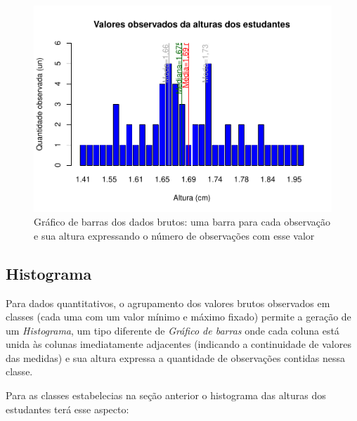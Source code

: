 \documentclass[
]{book}
\begin{document}
\begin{figure}
\centering
\includegraphics{apostila_files/figure-latex/unnamed-chunk-43-1.pdf}
\caption{\label{fig:unnamed-chunk-43}Gráfico de barras dos dados brutos: uma barra para cada observação e sua altura expressando o número de observações com esse valor}
\end{figure}

\hfill\break

\hypertarget{histograma}{%
\subsection{Histograma}\label{histograma}}

\hfill\break

Para dados quantitativos, o agrupamento dos valores brutos observados em classes (cada uma com um valor mínimo e máximo fixado) permite a geração de um \emph{Histograma}, um tipo diferente de \emph{Gráfico de barras} onde cada coluna está unida às colunas imediatamente adjacentes (indicando a continuidade de valores das medidas) e sua altura expressa a quantidade de observações contidas nessa classe.

\hfill\break

Para as classes estabelecias na seção anterior o histograma das alturas dos estudantes terá esse aspecto:

\hfill\break
\end{document}
